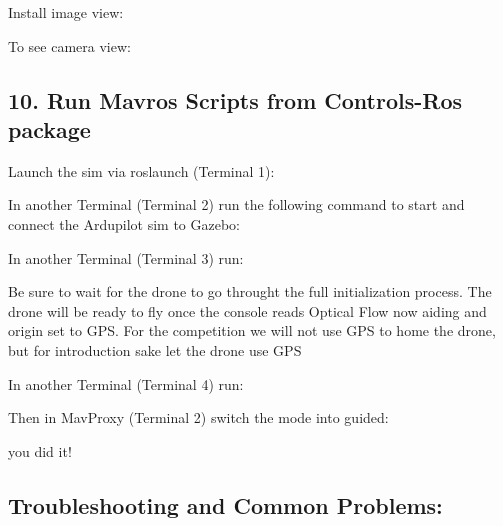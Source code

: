 Install image view\+: 
\begin{DoxyCode}{0}
\end{DoxyCode}


To see camera view\+: 
\begin{DoxyCode}{0}
\end{DoxyCode}


\subsection*{10. Run Mavros Scripts from Controls-\/\+Ros package}

Launch the sim via roslaunch (Terminal 1)\+: 
\begin{DoxyCode}{0}
\end{DoxyCode}
 In another Terminal (Terminal 2) run the following command to start and connect the Ardupilot sim to Gazebo\+: 
\begin{DoxyCode}{0}
\end{DoxyCode}
 In another Terminal (Terminal 3) run\+: 
\begin{DoxyCode}{0}
\end{DoxyCode}
 Be sure to wait for the drone to go throught the full initialization process. The drone will be ready to fly once the console reads Optical Flow now aiding and origin set to G\+PS. For the competition we will not use G\+PS to home the drone, but for introduction sake let the drone use G\+PS

In another Terminal (Terminal 4) run\+: 
\begin{DoxyCode}{0}
\end{DoxyCode}


Then in Mav\+Proxy (Terminal 2) switch the mode into {\ttfamily guided}\+: 
\begin{DoxyCode}{0}
\end{DoxyCode}


you did it! 🎉

\DoxyHorRuler


\subsection*{Troubleshooting and Common Problems\+:}

